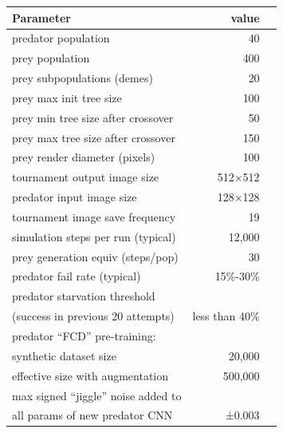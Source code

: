 \documentclass[letterpaper]{article}
\begin{document}
\begin{small}
\centering
\vspace{0.3cm}
\begin{tabular}{ |l|r|r| }
\hline
\textbf{Parameter} & \textbf{value} \\ 
\hline
predator population & 40 \\ 
prey population & 400 \\ 
prey subpopulations (demes) & 20 \\
prey max init tree size & 100 \\
prey min tree size after crossover & 50 \\
prey max tree size after crossover & 150 \\
\hline
prey render diameter (pixels) & 100 \\ 
tournament output image size & 512×512 \\ 
predator input image size & 128×128 \\ 
\hline
tournament image save frequency & 19 \\
simulation steps per run (typical) & 12,000 \\
prey generation equiv (steps/pop) & 30 \\
predator fail rate (typical) & 15\%-30\% \\
predator starvation threshold & \\
\hspace{0.2cm}(success in previous 20 attempts) & less than 40\% \\ 
\hline
predator “FCD” pre-training: & \\
\hspace{0.2cm} synthetic dataset size & 20,000 \\
\hspace{0.2cm} effective size with augmentation & 500,000 \\
\hline
max signed “jiggle” noise added to  & \\
\hspace{0.2cm} all params of new predator CNN & ±0.003 \\
\hline
\end{tabular}
\label{table:key_simulation_parameters} 
\end{small}

\end{document}
